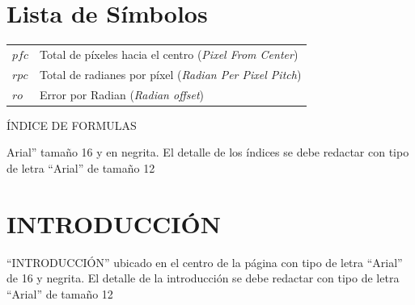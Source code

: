 \documentclass[12pt,oneside,a4paper]{book}
\begin{document}
\chapter*{Lista de Símbolos}
\begin{tabular}{ll}
         $pfc$   & Total de píxeles hacia el centro (\emph{Pixel From Center})\\
         $rpc $  & Total de radianes por píxel (\emph{Radian Per Pixel Pitch})\\
         $ro$    & Error por Radian (\emph{Radian offset})\\
\end{tabular}

\listoffigures       
\listoftables
\newpage
ÍNDICE DE FORMULAS

Arial” tamaño 16 y en negrita.
El detalle de los índices se debe redactar con tipo de letra “Arial” de tamaño 12

\chapter*{\centering INTRODUCCIÓN}
“INTRODUCCIÓN” ubicado en el centro de la página con tipo de letra “Arial” de 16 y negrita. El detalle de la introducción se debe redactar con tipo de letra “Arial” de tamaño 12


\mainmatter






\appendix

\small
\nocite{*}


\end{document}
